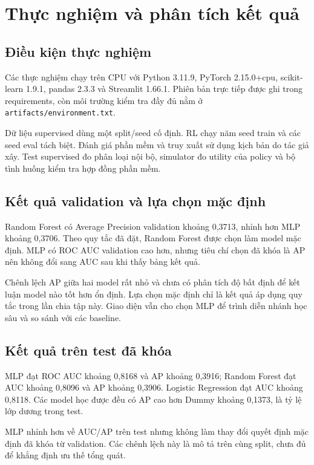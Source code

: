 \chapter{Thực nghiệm và phân tích kết quả}
\section{Điều kiện thực nghiệm}
Các thực nghiệm chạy trên CPU với Python 3.11.9, PyTorch 2.15.0+cpu, scikit-learn 1.9.1, pandas 2.3.3 và Streamlit 1.66.1. Phiên bản trực tiếp được ghi trong requirements, còn môi trường kiểm tra đầy đủ nằm ở \texttt{artifacts/environment.txt}.

Dữ liệu supervised dùng một split/seed cố định. RL chạy năm seed train và các seed eval tách biệt. Đánh giá phần mềm và truy xuất sử dụng kịch bản do tác giả xây. Test supervised đo phân loại nội bộ, simulator đo utility của policy và bộ tình huống kiểm tra hợp đồng phần mềm.

\section{Kết quả validation và lựa chọn mặc định}

Random Forest có Average Precision validation khoảng 0,3713, nhỉnh hơn MLP khoảng 0,3706. Theo quy tắc đã đặt, Random Forest được chọn làm model mặc định. MLP có ROC AUC validation cao hơn, nhưng tiêu chí chọn đã khóa là AP nên không đổi sang AUC sau khi thấy bảng kết quả.

Chênh lệch AP giữa hai model rất nhỏ và chưa có phân tích độ bất định để kết luận model nào tốt hơn ổn định. Lựa chọn mặc định chỉ là kết quả áp dụng quy tắc trong lần chia tập này. Giao diện vẫn cho chọn MLP để trình diễn nhánh học sâu và so sánh với các baseline.

\section{Kết quả trên test đã khóa}



MLP đạt ROC AUC khoảng 0,8168 và AP khoảng 0,3916; Random Forest đạt AUC khoảng 0,8096 và AP khoảng 0,3906. Logistic Regression đạt AUC khoảng 0,8118. Các model học được đều có AP cao hơn Dummy khoảng 0,1373, là tỷ lệ lớp dương trong test.

MLP nhỉnh hơn về AUC/AP trên test nhưng không làm thay đổi quyết định mặc định đã khóa từ validation. Các chênh lệch này là mô tả trên cùng split, chưa đủ để khẳng định ưu thế tổng quát.

